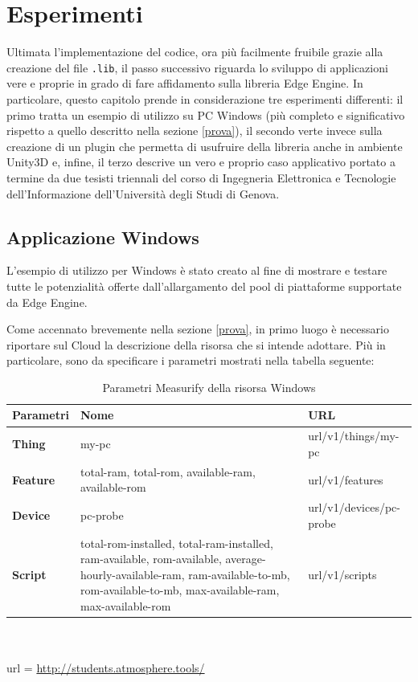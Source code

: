 \chapter{Esperimenti}
Ultimata l’implementazione del codice, ora più facilmente fruibile grazie alla creazione del file \texttt{.lib}, il passo successivo riguarda lo sviluppo di applicazioni vere e proprie in grado di fare affidamento sulla libreria Edge Engine. In particolare, questo capitolo prende in considerazione tre esperimenti differenti: il primo tratta un esempio di utilizzo su PC Windows (più completo e significativo rispetto a quello descritto nella sezione \ref{prova}), il secondo verte invece sulla creazione di un plugin che permetta di usufruire della libreria anche in ambiente Unity3D e, infine, il terzo descrive un vero e proprio caso applicativo portato a termine da due tesisti triennali del corso di Ingegneria Elettronica e Tecnologie dell'Informazione dell'Università degli Studi di Genova.
\section{Applicazione Windows}
L'esempio di utilizzo per Windows è stato creato al fine di mostrare e testare tutte le potenzialità offerte dall'allargamento del pool di piattaforme supportate da Edge Engine.

Come accennato brevemente nella sezione \ref{prova}, in primo luogo è necessario riportare sul Cloud la descrizione della risorsa che si intende adottare. Più in particolare, sono da specificare i parametri mostrati nella tabella seguente:

\begin{table}[H]
	\begin{tabular}{|p{}|p{}|p{}|}
		\hline
		\textbf{Parametri} & \textbf{Nome} & \textbf{URL}\\
		\hline
		\textbf{Thing} & my-pc & {{url}}/v1/things/my-pc\\
		\hline
		\textbf{Feature} & total-ram, total-rom, available-ram, available-rom & {{url}}/v1/features\\
		\hline
		\textbf{Device} & pc-probe & {{url}}/v1/devices/pc-probe\\	
		\hline
		\textbf{Script} & total-rom-installed, total-ram-installed, ram-available, rom-available, average-hourly-available-ram, ram-available-to-mb, rom-available-to-mb,  max-available-ram, max-available-rom & {{url}}/v1/scripts\\	
		\hline
	\end{tabular}
\\\\url = \url{http://students.atmosphere.tools/}
	\caption{Parametri Measurify della risorsa Windows}
	\label{paramMeas}
\end{table}

